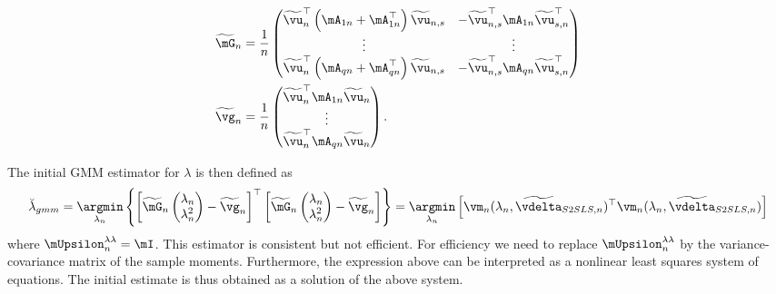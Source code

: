 \begin{equation*}
\begin{aligned}
\widetilde{\mG}_n & = \frac{1}{n}
                    \begin{pmatrix}
                      \widetilde{\vu}^\top_n\left(\mA_{1n} + \mA^\top_{1n}\right)\widetilde{\vu}_{n,s} & - \widetilde{\vu}^\top_{n,s}\mA_{1n}\widetilde{\vu}^\top_{s,n} \\
                      \vdots & \vdots \\
                      \widetilde{\vu}^\top_n\left(\mA_{qn} + \mA^\top_{qn}\right)\widetilde{\vu}_{n,s} & - \widetilde{\vu}^\top_{n,s}\mA_{qn}\widetilde{\vu}^\top_{s,n}
                    \end{pmatrix} \\
\widetilde{\vg}_n & = \frac{1}{n}\begin{pmatrix}
                                \widetilde{\vu}^\top_n\mA_{1n}\widetilde{\vu}_n \\
                                \vdots \\
                                \widetilde{\vu}^\top_n\mA_{qn}\widetilde{\vu}_n
                                \end{pmatrix}.
\end{aligned}
\end{equation*}


The initial GMM estimator for $\lambda$ is then defined as
\begin{equation*}
\breve{\lambda}_{gmm} = \underset{\lambda_n}{\argmin}\left\lbrace \left[\widetilde{\mG}_n\begin{pmatrix} \lambda_n \\
                \lambda^2_n
\end{pmatrix} - \widetilde{\vg}_n \right]^\top \left[\widetilde{\mG}_n\begin{pmatrix} \lambda_n \\
                \lambda^2_n
\end{pmatrix} - \widetilde{\vg}_n\right]\right\rbrace = \underset{\lambda_n}{\argmin}\left[\vm_n(\lambda_n,\widetilde{\vdelta}_{S2SLS, n})^\top \vm_n(\lambda_n,\widetilde{\vdelta}_{S2SLS, n})\right]
\end{equation*}
%
where $\mUpsilon^{\lambda\lambda}_n = \mI$. This estimator is consistent but not efficient. For efficiency we need to replace $\mUpsilon^{\lambda\lambda}_n$ by the variance-covariance matrix of the sample moments. Furthermore, the expression above can be interpreted as a nonlinear least squares system of equations. The initial estimate is thus obtained as a solution of the above system. 

